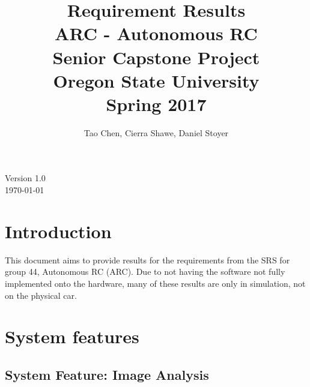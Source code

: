 \documentclass[compsoc,draftclsnofoot,onecolumn,10pt]{IEEEtran}
\date{}
\begin{document}
\begin{titlepage}
\title{
Requirement Results\\
\LARGE
ARC - Autonomous RC\\
Senior Capstone Project\\
Oregon State University\\
Spring 2017
}
\author{Tao Chen, Cierra Shawe, Daniel Stoyer}
\maketitle
\begin{center}
	Version 1.0\\
	\today
\end{center}

    

\thispagestyle{empty} %
	
\end{titlepage}

\tableofcontents

\newpage

\section{Introduction} %
This document aims to provide results for the requirements from the SRS for group 44, Autonomous RC (ARC). 
Due to not having the software not fully implemented onto the hardware, many of these results are only in simulation, not on the physical car.

\section{System features}

\subsection{System Feature: Image Analysis}
\end{document}
